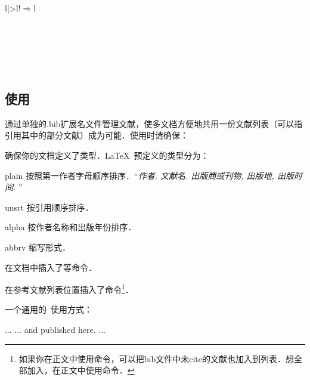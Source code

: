 \begin{table}[!hbt]
\begin{tabular}{l|>{\ttfamily}l!{$\Rightarrow$}l}
 \\
\hline
{} \\
\hline
{} \\
\hline
{} \\
\hline
{} \\
\hline
{} \\
\hline
\end{tabular}
\end{table}

\subsection{\bibtex 使用}
\bibtex 通过单独的.bib扩展名文件管理文献，使多文档方便地共用一份文献列表（可以指引用其中的部分文献）成为可能．使用时请确保：
\begin{feae}
\item 确保你的文档定义了类型．\LaTeX\ 预定义的类型分为：
  \begin{para}
    \item[plain] 按照第一作者字母顺序排序．“\textit{作者. 文献名. 出版商或刊物, 出版地, 出版时间.} ”
    \item[unsrt] 按引用顺序排序．
    \item[alpha] 按作者名称和出版年份排序．
    \item[abbrv] 缩写形式．
  \end{para}
\item 在文档中插入了等命令．
\item 在参考文献列表位置插入了命令\footnote{如果你在正文中使用命令，可以把bib文件中未cite的文献也加入到列表．想全部加入，在正文中使用命令．}．
\end{feae}

一个通用的\bibtex\ 使用方式：
\begin{latex}


    ...
    ... and published here\cite{Smith93TRB}.
    ...
    

\end{latex}

